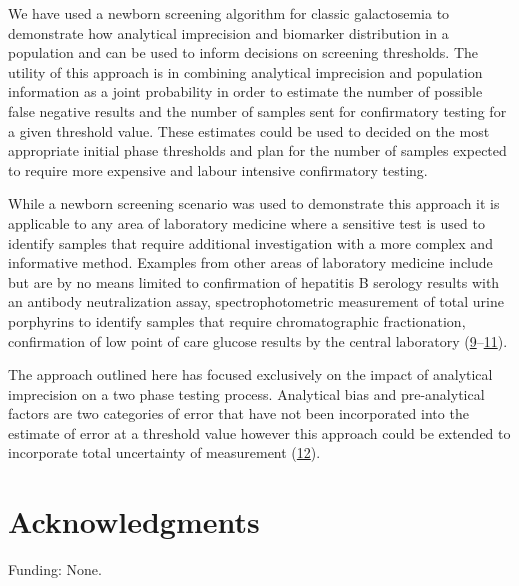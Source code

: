 \documentclass[review]{elsarticle}
\begin{document}
We have used a newborn screening algorithm for classic galactosemia to
demonstrate how analytical imprecision and biomarker distribution in a
population and can be used to inform decisions on screening
thresholds. The utility of this approach is in combining analytical
imprecision and population information as a joint probability in order
to estimate the number of possible false negative results and the
number of samples sent for confirmatory testing for a given threshold
value. These estimates could be used to decided on the most
appropriate initial phase thresholds and plan for the number of
samples expected to require more expensive and labour intensive
confirmatory testing.

While a newborn screening scenario was used to demonstrate this
approach it is applicable to any area of laboratory medicine where a
sensitive test is used to identify samples that require additional
investigation with a more complex and informative method. Examples
from other areas of laboratory medicine include but are by no means
limited to confirmation of hepatitis B serology results with an
antibody neutralization assay, spectrophotometric measurement of total
urine porphyrins to identify samples that require chromatographic
fractionation, confirmation of low point of care glucose results by
the central laboratory (\hyperlink{citeproc_bib_item_9}{9}–\hyperlink{citeproc_bib_item_11}{11}).

The approach outlined here has focused exclusively on the impact of
analytical imprecision on a two phase testing process. Analytical bias
and pre-analytical factors are two categories of error that have not
been incorporated into the estimate of error at a threshold value
however this approach could be extended to incorporate total
uncertainty of measurement (\hyperlink{citeproc_bib_item_12}{12}).

\section*{Acknowledgments}
\label{sec:org4f6b1a5}
Funding: None.
\end{document}
